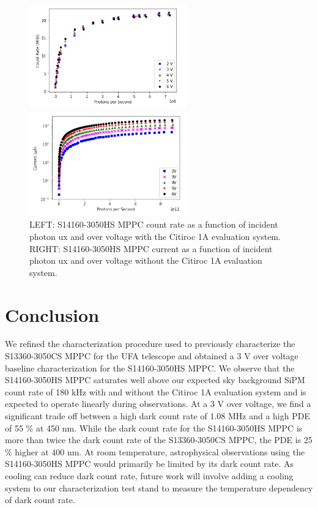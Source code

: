 \documentclass{article}
\begin{document}
\begin{figure}[ht]

  \begin{minipage}[b]{0.49\textwidth}
    \centering     
    \includegraphics[height=4.5cm]{images/figura8.jpg}
  \end{minipage}
  \hfill
  \begin{minipage}[b]{0.49\textwidth}
    \centering     
    \includegraphics[height=4.5cm]{images/figura9.jpg}
  \end{minipage}
     
\caption{LEFT: S14160-3050HS MPPC count rate as a function of incident photon ux and over voltage with the Citiroc 1A evaluation system. RIGHT: S14160-3050HS MPPC current as a function of incident photon ux and over voltage without the Citiroc 1A evaluation system.}
\label{fig:PhotonsPerSecond}
    
\end{figure}

\section{Conclusion}
We refined the characterization procedure used to previously characterize the S13360-3050CS MPPC for the UFA telescope and obtained a 3 V over voltage baseline characterization for the S14160-3050HS MPPC. We observe that the S14160-3050HS MPPC saturates well above our expected sky background SiPM count rate of 180 kHz with and without the Citiroc 1A evaluation system and is expected to operate linearly during observations. At a 3 V over voltage, we find a significant trade off between a high dark count rate of 1.08 MHz and a high PDE of 55 \% at 450 nm. While the dark count rate for the S14160-3050HS MPPC is more than twice the dark count rate of the S13360-3050CS MPPC, the PDE is 25 \% higher at 400 nm.\cite{li2019characterization} At room temperature, astrophysical observations using the S14160-3050HS MPPC would primarily be limited by its dark count rate. As cooling can reduce dark count rate, future work will involve adding a cooling system to our characterization test stand to measure the temperature dependency of dark count rate.
\end{document}
